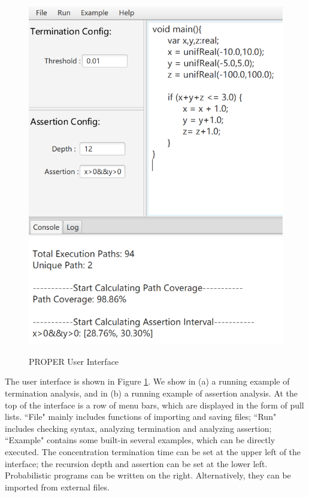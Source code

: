 \documentclass[conference]{IEEEtran}
\begin{document}
\begin{figure}[hb]
{		\includegraphics[scale=0.65]{img/interface2} 
	}
	\caption{PROPER User Interface} %
	\label{interface} %
\end{figure}
The user interface is shown in Figure \ref{interface}. We show in (a) a running example of termination analysis, and in (b) a running example of assertion analysis. At the top of the interface is a row of menu bars, which are displayed in the form of pull lists. ``File" mainly includes functions of importing and saving files; ``Run" includes checking syntax, analyzing termination and analyzing assertion; ``Example" contains some built-in several examples, which can be directly executed. The concentration termination time can be set at the upper left of the interface; the recursion depth and assertion can be set at the lower left. Probabilistic programs can be written on the right. Alternatively, they can be  imported from external files. 
\end{document}
